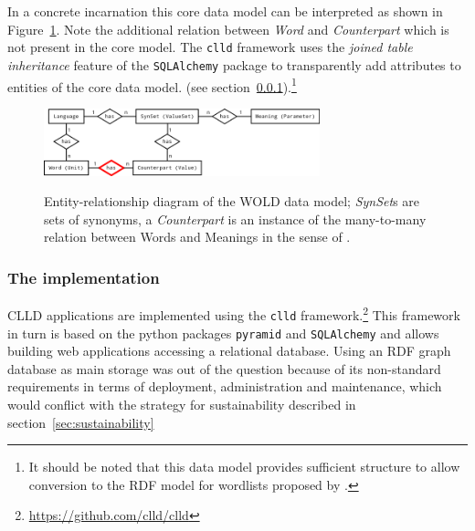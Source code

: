 \documentclass[a4paper,10pt]{article}
\begin{document}
In a concrete incarnation this core data model can be interpreted as shown in Figure~\ref{wolddatamodel}.
Note the additional relation between \emph{Word} and \emph{Counterpart} which is not present in the core model.
The \texttt{clld} framework uses the \emph{joined table inheritance} feature of the \texttt{SQLAlchemy} package
to transparently add attributes to entities of the core data model. 
(see section~\ref{sec:implementation}).\footnote{It should be noted that this data model provides
sufficient structure to allow conversion to the RDF model for wordlists proposed by
.}


\begin{figure}[h!]
  \caption{Entity-relationship diagram of the WOLD data model; \textit{SynSet}s are sets of synonyms,
  a \textit{Counterpart} is an instance of the many-to-many relation between Words and Meanings
  in the sense of .\vspace{0.3cm}}
  \centering
\includegraphics[width=8cm]{wold_erd.png}
\label{wolddatamodel}
\end{figure}


\subsubsection{The implementation}
\label{sec:implementation}
CLLD applications are implemented using the \texttt{clld} framework.\footnote{\url{https://github.com/clld/clld}}
This framework in turn is based on the python packages \texttt{pyramid} and \texttt{SQLAlchemy}
and allows building web applications accessing a relational database.
Using an RDF graph database as main storage was out of the question because of its non-standard requirements
in terms of deployment, administration and maintenance, which would conflict with the strategy
for sustainability described in section~\ref{sec:sustainability}
\end{document}
